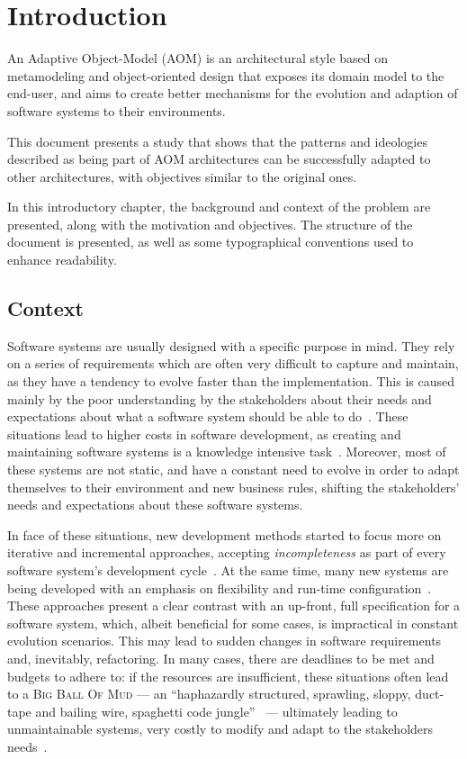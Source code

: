 \chapter{Introduction}\label{chap:intro}

An Adaptive Object-Model (AOM) is an architectural style based on metamodeling and object-oriented design that exposes its domain model to the end-user, and aims to create better mechanisms for the evolution and adaption of software systems to their environments.

This document presents a study that shows that the patterns and ideologies described as being part of AOM architectures can be successfully adapted to other architectures, with objectives similar to the original ones.

In this introductory chapter, the background and context of the problem are presented, along with the motivation and objectives. The structure of the document is presented, as well as some typographical conventions used to enhance readability.

\section{Context}\label{sec:context}

Software systems are usually designed with a specific purpose in mind. They rely on a series of requirements which are often very difficult to capture and maintain, as they have a tendency to evolve faster than the implementation. This is caused mainly by the poor understanding by the stakeholders about their needs and expectations about what a software system should be able to do~\cite{PT07}. These situations lead to higher costs in software development, as creating and maintaining software systems is a knowledge intensive task~\cite{AdOdSBD07}. Moreover, most of these systems are not static, and have a constant need to evolve in order to adapt themselves to their environment and new business rules, shifting the stakeholders' needs and expectations about these software systems.

In face of these situations, new development methods started to focus more on iterative and incremental approaches, accepting \emph{incompleteness} as part of every software system's development cycle~\cite{WC03}. At the same time, many new systems are being developed with an emphasis on flexibility and run-time configuration~\cite{YJ02}. These approaches present a clear contrast with an up-front, full specification for a software system, which, albeit beneficial for some cases, is impractical in constant evolution scenarios. This may lead to sudden changes in software requirements and, inevitably, refactoring. In many cases, there are deadlines to be met and budgets to adhere to: if the resources are insufficient, these situations often lead to a \textsc{Big Ball Of Mud} --- an ``haphazardly structured, sprawling, sloppy, duct-tape and bailing wire, spaghetti code jungle''~\cite{big_ball_of_mud} --- ultimately leading to unmaintainable systems, very costly to modify and adapt to the stakeholders needs~\cite{FY97}.

